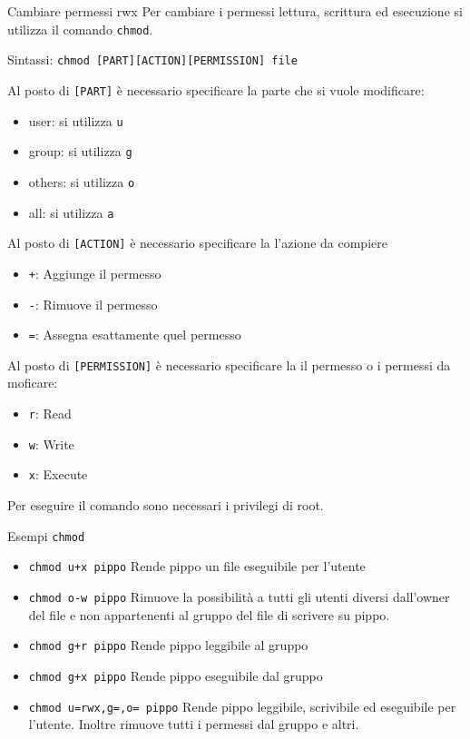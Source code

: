\begin{frame}{Cambiare permessi rwx}
  Per cambiare i permessi lettura, scrittura ed esecuzione si utilizza il 
  comando \texttt{chmod}.\bigskip

  Sintassi: \texttt{chmod [PART][ACTION][PERMISSION] file}\bigskip

   {
    Al posto di \texttt{[PART]} è necessario specificare la 
    parte che si vuole modificare:
    \begin{itemize}
      \item user: si utilizza \texttt{u}
      \item group: si utilizza \texttt{g}
      \item others: si utilizza \texttt{o}
      \item all: si utilizza \texttt{a}
    \end{itemize}
  }

   {
    Al posto di \texttt{[ACTION]} è necessario specificare la 
    l'azione da compiere
    \begin{itemize}
      \item \texttt{+}: Aggiunge il permesso
      \item \texttt{-}: Rimuove il permesso
      \item \texttt{=}: Assegna esattamente quel permesso
    \end{itemize}
  }

   {
    Al posto di \texttt{[PERMISSION]} è necessario specificare la 
    il permesso o i permessi da moficare:
    \begin{itemize}
      \item \texttt{r}: Read
      \item \texttt{w}: Write
      \item \texttt{x}: Execute
    \end{itemize}
  }

  \bigskip Per eseguire il comando sono necessari i privilegi di root.
\end{frame}

\begin{frame}{Esempi \texttt{chmod}}
  \begin{itemize}
    \item \texttt{chmod u+x pippo} Rende pippo un file eseguibile per l'utente
    \item \texttt{chmod o-w pippo} Rimuove la possibilità a tutti gli utenti
      diversi dall'owner del file e non appartenenti al gruppo del file di 
      scrivere su pippo.
    \item \texttt{chmod g+r pippo} Rende pippo leggibile al gruppo
    \item \texttt{chmod g+x pippo} Rende pippo eseguibile dal gruppo
    \item \texttt{chmod u=rwx,g=,o= pippo} Rende pippo leggibile, scrivibile ed
      eseguibile per l'utente. Inoltre rimuove tutti i permessi dal gruppo e 
      altri.
  \end{itemize}
\end{frame}

